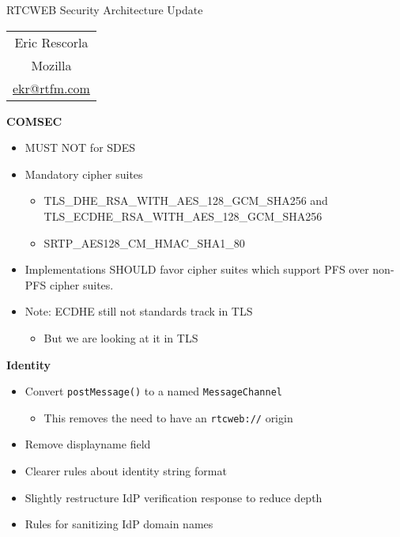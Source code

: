 \documentclass[helvetica]{seminar}
\newcommand{\heading}[1]{%
  \begin{center} 
    \large\bf 
    #1 
  \end{center} 
  \vspace{.4 in}}
\begin{document}
\begin{slide}
\begin{center}
\vspace{.5 in}
\LARGE{{\bf}RTCWEB Security Architecture Update}\\
\vspace{.2in}
\vspace{3em}
\large{
\begin{tabular}{c}
Eric Rescorla\\
Mozilla\\
\url{ekr@rtfm.com}
\end{tabular}
}
\end{center}

\end{slide}

\centerslidesfalse 


\begin{slide}
\heading{COMSEC}

\begin{itemize}
\item MUST NOT for SDES
\item Mandatory cipher suites
  \begin{itemize}
  \item TLS\_DHE\_RSA\_WITH\_AES\_128\_GCM\_SHA256 and TLS\_ECDHE\_RSA\_WITH\_AES\_128\_GCM\_SHA256 
  \item SRTP\_AES128\_CM\_HMAC\_SHA1\_80
  \end{itemize}
\item Implementations SHOULD favor cipher suites which support PFS over non-PFS cipher suites.
\item Note: ECDHE still not standards track in TLS
  \begin{itemize}
  \item But we are looking at it in TLS
  \end{itemize}
\end{itemize}

\end{slide}


\begin{slide}
\heading{Identity}

\begin{itemize}
\item Convert \verb^postMessage()^ to a named \verb^MessageChannel^
  \begin{itemize}
  \item This removes the need to have an \verb^rtcweb://^ origin
  \end{itemize}

\item Remove displayname field
\item Clearer rules about identity string format
\item Slightly restructure IdP verification response to reduce depth
\item Rules for sanitizing IdP domain names
\end{itemize}

\end{slide}
\end{document}
